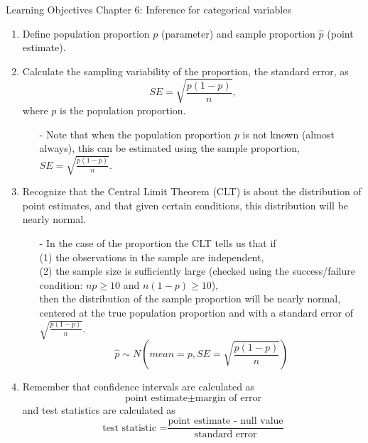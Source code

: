 \documentclass[11pt]{article}
\begin{document}
{\LARGE \textcolor{oiB}{Learning Objectives \hfill Chapter 6: Inference for categorical variables}} \\

%
\begin{enumerate}
\renewcommand\labelenumi{\textcolor{light}{\textbf{LO \theenumi.}}}

\item Define population proportion $p$ (parameter) and sample proportion $\hat{p}$ (point estimate).

\item Calculate the sampling variability of the proportion, the standard error, as 
\[ SE = \sqrt{\frac{p(1-p)}{n}}, \] 
where $p$ is the population proportion.
\begin{itemize}
\item[-] Note that when the population proportion $p$ is not known (almost always), this can be estimated using the sample proportion, $SE = \sqrt{\frac{\hat{p}(1-\hat{p})}{n}}$.
\end{itemize}

\item Recognize that the Central Limit Theorem (CLT) is about the distribution of point estimates, and that given certain conditions, this distribution will be nearly normal.
\begin{itemize}
\item[-] In the case of the proportion the CLT tells us that if \\
(1) the observations in the sample are independent, \\
(2) the sample size is sufficiently large (checked using the success/failure condition: $np \ge 10$ and $n(1-p) \ge 10$), \\
then the distribution of the sample proportion will be nearly normal, centered at the true population proportion and with a standard error of $\sqrt{\frac{p(1-p)}{n}}$.
\[ \hat{p} \sim N \left( mean = p, SE = \sqrt{\frac{p(1-p)}{n}} \right) \]
\end{itemize}

\item Remember that confidence intervals are calculated as 
\[ \text{point estimate} \pm \text{margin of error} \]
and test statistics are calculated as 
\[ \text{test statistic =} \frac{\text{point estimate - null value}}{\text{standard error}} \]


\end{enumerate}
\end{document}
